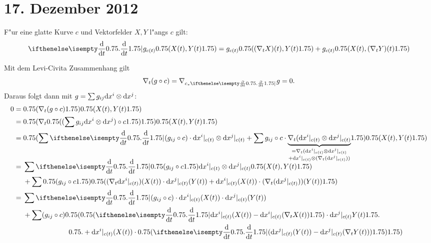 \section{17. Dezember 2012}
\setcounter{Aufg}{0} %
\setcounter{Loes}{0}

\begin{description}[font=\normalfont\itshape]
\item[Behauptung:]
	F"ur eine glatte Kurve $c$ und Vektorfelder $X, Y$ l"angs $c$ gilt:
		\[ \difffrac{}{t}g_{c(t)} \left( X(t), Y(t) \right) = g_{c(t)} \left( (\nabla_tX)(t), Y(t) \right) + g_{c(t)} \left( X(t), (\nabla_tY)(t) \right) \]
\item[Beweis:]
	Mit dem Levi-Civita Zusammenhang gilt
		\[ \nabla_t(g \circ c) = \nabla_{c_*\pdifffrac{}{t}} g = 0. \]
	Daraus folgt dann mit $g = \sum g_{ij} \mathrm{d} x^{i} \otimes \mathrm{d} x^j$:
	\begin{align*}
		0 ={}& \left( \nabla_t(g \circ c) \right) \left( X(t), Y(t) \right)\\
		={}& \left( \nabla_t \left( (\sum g_{ij} \dop x^{i} \otimes \dop x^j) \circ c \right) \right) \left(X(t), Y(t)\right)\\
		={}& \left( \sum \difffrac{}{t} (g_{ij} \circ c) \cdot \dop x^{i}|_{c(t)} \otimes \dop x^j|_{c(t)} + \sum g_{ij} \circ c \cdot \smash{\underbrace{\nabla_t(\dop x^{i}|_{c(t)} \otimes \dop x^j|_{c(t)}}_{\mathclap{\substack{= \nabla_t(\dop x^{i}|_{c(t)} \otimes \dop x^j|_{c(t)} \\ + \dop x^{i}|_{c(t)} \otimes (\nabla_t(\dop x^j|_{c(t)}))}}}} \right) \left( X(t), Y(t) \right) \vphantom{\underbrace{\nabla_t}_{\substack{\nabla_t \\ \nabla_t}}}\\
		={}& \sum \difffrac{}{t} \left( g_{ij} \circ c \right) \dop x^{i}|_{c(t)} \otimes \dop x^{j}|_{c(t)} \left( X(t), Y(t) \right)\\
		 & + \sum \left( g_{ij} \circ c \right) \left( (\nabla_t \dop x^{i}|_{c(t)})(X(t)) \cdot \dop x^j|_{c(t)} (Y(t)) + \dop x^{i}|_{c(t)}(X(t)) \cdot (\nabla_t(\dop x^j|_{c(t)}))(Y(t)) \right)\\
		={}& \sum \difffrac{}{t} (g_{ij} \circ c) \cdot \dop x^{i}|_{c(t)}(X(t)) \cdot \dop x^j|_{c(t)} (Y(t))\\
		 & + \sum (g_{ij} \circ c) \left( \left( \difffrac{}{t} \dop x^{i}|_{c(t)}(X(t)) - \dop x^{i}|_{c(t)} ( \nabla_t X(t)) \right) \cdot \dop x^j|_{c(t)} Y(t) \right.\\
		 & \hphantom{+ \sum (g_{ij} \circ c) ()} \left. + \dop x^{i}|_{c(t)}(X(t)) \cdot \left( \difffrac{}{t}(\dop x^j|_{c(t)} (Y(t)) - \dop x^j|_{c(t)}(\nabla_t Y(t))) \right) \right)\\

\end{align*}
\end{description}
